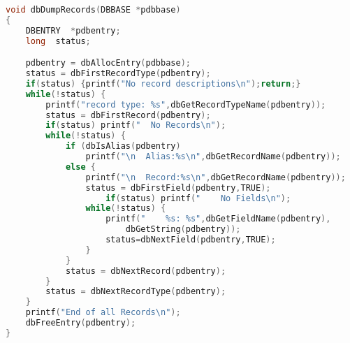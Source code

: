 \begin{lstlisting}[language=C]
void dbDumpRecords(DBBASE *pdbbase)
{
    DBENTRY  *pdbentry;
    long  status;

    pdbentry = dbAllocEntry(pdbbase);
    status = dbFirstRecordType(pdbentry);
    if(status) {printf("No record descriptions\n");return;}
    while(!status) {
        printf("record type: %s",dbGetRecordTypeName(pdbentry));
        status = dbFirstRecord(pdbentry);
        if(status) printf("  No Records\n"); 
        while(!status) {
            if (dbIsAlias(pdbentry)
                printf("\n  Alias:%s\n",dbGetRecordName(pdbentry));
            else {
                printf("\n  Record:%s\n",dbGetRecordName(pdbentry));
                status = dbFirstField(pdbentry,TRUE);
                    if(status) printf("    No Fields\n");
                while(!status) {
                    printf("    %s: %s",dbGetFieldName(pdbentry),
                        dbGetString(pdbentry));
                    status=dbNextField(pdbentry,TRUE);
                }
            }
            status = dbNextRecord(pdbentry);
        }
        status = dbNextRecordType(pdbentry);
    }
    printf("End of all Records\n");
    dbFreeEntry(pdbentry);
}
\end{lstlisting}

